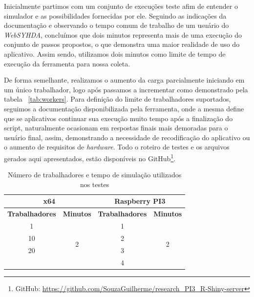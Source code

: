 \documentclass[12pt,english,brazil]{article}
\begin{document}
Inicialmente partimos com um conjunto de execuções teste afim de entender o simulador e as possibilidades fornecidas por ele. Seguindo as indicações da documentação e observando o tempo comum de trabalho de um usuário do \emph{WebSYHDA}, concluímos que %
dois minutos representa mais de uma execução do conjunto de passos propostos, o que demonstra uma maior realidade de uso do aplicativo. Assim sendo, utilizamos dois minutos como limite de tempo de execução da ferramenta para nossa coleta.




De forma semelhante, realizamos o aumento da carga parcialmente iniciando em um único trabalhador, logo após passamos a incrementar como demonstrado pela tabela ~\ref{tab:workers}. Para definição do limite de trabalhadores suportados, seguimos a documentação disponibilizada pela ferramenta, onde a mesma define que se aplicativos continuar sua execução muito tempo após a finalização do script, naturalmente ocasionam em respostas finais mais demoradas para o usuário final, assim, demonstrando a necessidade de recodificação do aplicativo ou o aumento de requisitos de \emph{hardware}. Todo o roteiro de testes e os arquivos gerados aqui apresentados, estão disponíveis no GitHub\footnote{GitHub: \url{https://github.com/SouzaGuilherme/research_PI3_R-Shiny-server}}.

\begin{table}[htbp]
\centering
\caption{Número de trabalhadores e tempo de simulação utilizados nos testes}
\begin{tabular}{c|c|cc}
\hline
\multicolumn{2}{c|}{\textbf{x64}}           & \multicolumn{2}{c}{\textbf{Raspberry PI3}}                       \\ \hline
\textbf{Trabalhadores} & \textbf{Minutos}   & \multicolumn{1}{c|}{\textbf{Trabalhadores}} & \textbf{Minutos}   \\ \hline
1                      & \multirow{4}{*}{2} & \multicolumn{1}{c|}{1}                      & \multirow{4}{*}{2} \\ \cline{1-1} \cline{3-3}
10        &  & \multicolumn{1}{c|}{2} &  \\ \cline{1-1} \cline{3-3}
20        &  & \multicolumn{1}{c|}{3} &  \\ \cline{1-1} \cline{3-3}
\textbf{} &  & \multicolumn{1}{c|}{4} &  \\ \hline
\end{tabular}
\end{table}
\end{document}
